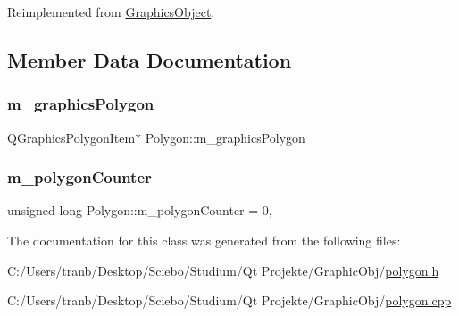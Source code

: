 Reimplemented from \hyperlink{class_graphics_object_ad985316df1516a5a7311161250b5e233}{Graphics\+Object}.



\subsection{Member Data Documentation}
\mbox{\label{class_polygon_a464037e9e2eb2a1fa131eed357d02f83}} 
\subsubsection{\texorpdfstring{m\+\_\+graphics\+Polygon}{m\_graphicsPolygon}}
{\footnotesize\ttfamily Q\+Graphics\+Polygon\+Item$\ast$ Polygon\+::m\+\_\+graphics\+Polygon\hspace{0.3cm}{\ttfamily [protected]}}

\mbox{\label{class_polygon_a20f77e208065a18ac17b5b0cd5bd0dce}} 
\subsubsection{\texorpdfstring{m\+\_\+polygon\+Counter}{m\_polygonCounter}}
{\footnotesize\ttfamily unsigned long Polygon\+::m\+\_\+polygon\+Counter = 0\hspace{0.3cm}{\ttfamily [static]}, {\ttfamily [protected]}}



The documentation for this class was generated from the following files\+:\begin{DoxyCompactItemize}
\item 
C\+:/\+Users/tranb/\+Desktop/\+Sciebo/\+Studium/\+Qt Projekte/\+Graphic\+Obj/\hyperlink{polygon_8h}{polygon.\+h}\item 
C\+:/\+Users/tranb/\+Desktop/\+Sciebo/\+Studium/\+Qt Projekte/\+Graphic\+Obj/\hyperlink{polygon_8cpp}{polygon.\+cpp}\end{DoxyCompactItemize}
